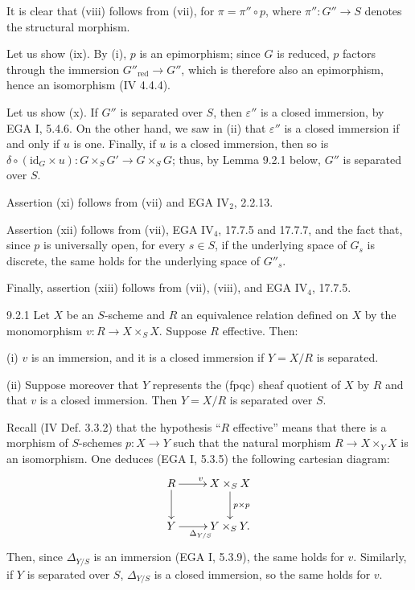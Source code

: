 It is clear that (viii) follows from (vii), for $\pi=\pi''\circ p$, where $\pi'':G''\to S$ denotes the structural morphism.

Let us show (ix). By (i), $p$ is an epimorphism; since $G$ is reduced, $p$ factors through the immersion $G''_{\mathrm{red}}\to G''$, which is therefore also an epimorphism, hence an isomorphism (IV 4.4.4).

Let us show (x). If $G''$ is separated over $S$, then $\varepsilon''$ is a closed immersion, by EGA I, 5.4.6. On the other hand, we saw in (ii) that $\varepsilon''$ is a closed immersion if and only if $u$ is one. Finally, if $u$ is a closed immersion, then so is $\delta\circ(\mathrm{id}_G\times u):G\times_S G'\to G\times_S G$; thus, by Lemma 9.2.1 below, $G''$ is separated over $S$.

Assertion (xi) follows from (vii) and EGA IV$_2$, 2.2.13.

Assertion (xii) follows from (vii), EGA IV$_4$, 17.7.5 and 17.7.7, and the fact that, since $p$ is universally open, for every $s\in S$, if the underlying space of $G_s$ is discrete, the same holds for the underlying space of $G''_s$.

Finally, assertion (xiii) follows from (vii), (viii), and EGA IV$_4$, 17.7.5.

\begin{lemma}{9.2.1}\label{VIB.9.2.1}
Let $X$ be an $S$-scheme and $R$ an equivalence relation defined on $X$ by the monomorphism $v:R\to X\times_S X$. Suppose $R$ effective. Then:

(i) $v$ is an immersion, and it is a closed immersion if $Y=X/R$ is separated.

(ii) Suppose moreover that $Y$ represents the (fpqc) sheaf quotient of $X$ by $R$ and that $v$ is a closed immersion. Then $Y=X/R$ is separated over $S$.
\end{lemma}
Recall (IV Def. 3.3.2) that the hypothesis ``$R$ effective'' means that there is a morphism of $S$-schemes $p:X\to Y$ such that the natural morphism $R\to X\times_Y X$ is an isomorphism. One deduces (EGA I, 5.3.5) the following cartesian diagram:
\[
\xymatrix{R\ar[r]^v\ar[d]&X\times_S X\ar[d]^{p\times p}\\Y\ar[r]_{\Delta_{Y/S}}&Y\times_S Y.}
\]
Then, since $\Delta_{Y/S}$ is an immersion (EGA I, 5.3.9), the same holds for $v$. Similarly, if $Y$ is separated over $S$, $\Delta_{Y/S}$ is a closed immersion, so the same holds for $v$.


